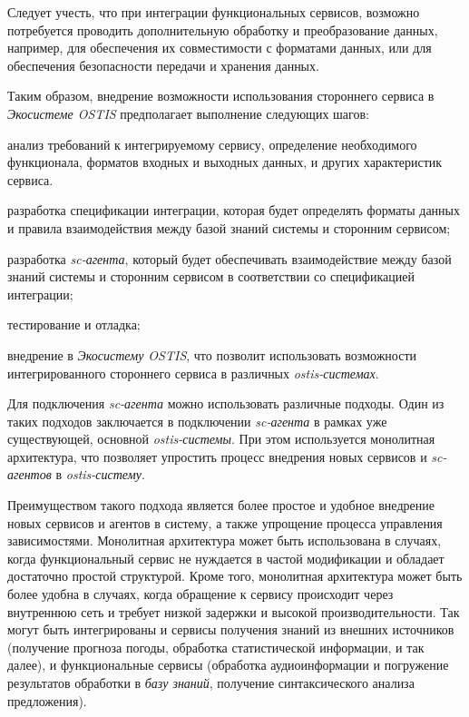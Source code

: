 Следует учесть, что при интеграции функциональных сервисов, возможно потребуется проводить дополнительную обработку и преобразование данных, например, для обеспечения их совместимости с форматами данных, или для обеспечения безопасности передачи и хранения данных.

Таким образом, внедрение возможности использования стороннего сервиса в \textit{Экосистеме OSTIS} предполагает выполнение следующих шагов:
\begin{textitemize}
    \item анализ требований к интегрируемому сервису, определение необходимого функционала, форматов входных и выходных данных, и других характеристик сервиса.
    \item разработка спецификации интеграции, которая будет определять форматы данных и правила взаимодействия между базой знаний системы и сторонним сервисом;
    \item разработка \textit{sc-агента}, который будет обеспечивать взаимодействие между базой знаний системы и сторонним сервисом в соответствии со спецификацией интеграции;
    \item тестирование и отладка;
    \item внедрение в \textit{Экосистему OSTIS}, что позволит использовать возможности интегрированного стороннего сервиса в различных \textit{ostis-системах}.
\end{textitemize}

Для подключения \textit{sc-агента} можно использовать различные подходы. Один из таких подходов заключается в подключении \textit{sc-агента} в рамках уже существующей, основной \textit{ostis-системы}. При этом используется монолитная архитектура, что позволяет упростить процесс внедрения новых сервисов и \textit{sc-агентов} в \textit{ostis-систему}.

Преимуществом такого подхода является более простое и удобное внедрение новых сервисов и агентов в систему, а также упрощение процесса управления зависимостями. Монолитная архитектура может быть использована в случаях, когда функциональный сервис не нуждается в частой модификации и обладает достаточно простой структурой. Кроме того, монолитная архитектура может быть более удобна в случаях, когда обращение к сервису происходит через внутреннюю сеть и требует низкой задержки и высокой производительности. Так могут быть интегрированы и сервисы получения знаний из внешних источников (получение прогноза погоды, обработка статистической информации, и так далее), и функциональные сервисы (обработка аудиоинформации и погружение результатов обработки в \textit{базу знаний}, получение синтаксического анализа предложения). 

